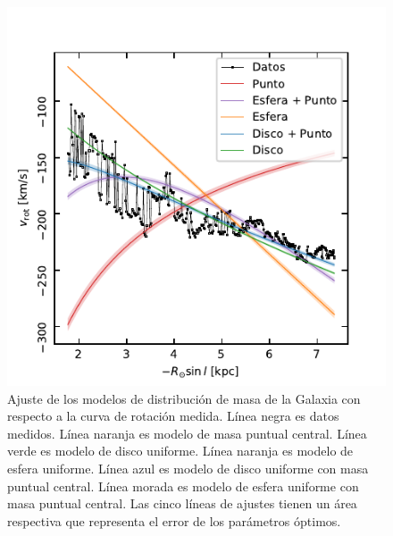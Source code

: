 \begin{figure}[htbp]
	\includegraphics{rsc/massmodels.pdf}
	\caption{Ajuste de los modelos de distribución de masa de la Galaxia con respecto a la curva de rotación medida. Línea negra es datos medidos. Línea naranja es modelo de masa puntual central. Línea verde es modelo de disco uniforme. Línea naranja es modelo de esfera uniforme. Línea azul es modelo de disco uniforme con masa puntual central. Línea morada es modelo de esfera uniforme con masa puntual central. Las cinco líneas de ajustes tienen un área respectiva que representa el error de los parámetros óptimos.}
	\label{fig:massmodel}
\end{figure}
